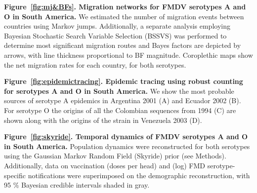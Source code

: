 \documentclass[10pt]{article}
\begin{document}
{\bf Figure~\ref{fig:mj&BFs}. Migration networks for FMDV serotypes A and O in South America.} We estimated the number of migration events between countries using Markov jumps.
Additionally, a separate analysis employing Bayesian Stochastic Search Variable Selection (BSSVS) was performed to determine most significant migration routes and Bayes factors are depicted by arrows, with line thickness proportional to BF magnitude.
Coroplethic maps show the net migration rates for each country, for both serotypes.

{\bf Figure~\ref{fig:epidemictracing}. Epidemic tracing using robust counting for serotypes A and O in South America.} We show the most probable sources of serotype A epidemics in Argentina 2001 (A) and Ecuador 2002 (B).
For serotype O the origins of  all the Colombian sequences from 1994 (C) are shown along with the origins of the strain in Venezuela 2003 (D).

{\bf Figure~\ref{fig:skyride}. Temporal dynamics of FMDV serotypes A and O in South America.} Population dynamics were reconstructed for both serotypes using the Gaussian Markov Random Field (Skyride) prior (see Methods).
Additionally, data on vaccination  (doses per head) and (log) FMD serotype-specific notifications were superimposed on the demographic reconstruction, with 95 \% Bayesian credible intervals shaded in gray.

\newpage
\end{document}
